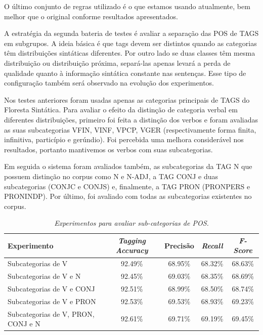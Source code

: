 O último conjunto de regras utilizado é o que estamos usando atualmente, bem melhor que o original conforme resultados apresentados. 

A estratégia da segunda bateria de testes é avaliar a separação das POS de TAGS em subgrupos. A ideia básica é que tags devem ser distintos quando as categorias têm distribuições sintáticas diferentes. Por outro lado se duas classes têm mesma distribuição ou distribuição próxima, separá-las apenas levará a perda de qualidade quanto à informação sintática constante nas sentenças. Esse tipo de configuração também será observado na evolução dos experimentos.

Nos testes anteriores foram usadas apenas as categorias principais de TAGS do Floresta Sintática. Para avaliar o efeito da distinção de categoria verbal em diferentes distribuições, primeiro foi feita a distinção dos verbos e foram avaliadas as suas subcategorias VFIN, VINF, VPCP, VGER (respectivamente forma finita, infinitiva, particípio e gerúndio). Foi percebida uma melhora considerável nos resultados, portanto mantivemos os verbos com suas subcategorias. 

Em seguida o sistema foram avaliados também, as subcategorias da TAG N que possuem distinção no corpus como N e N-ADJ, a TAG CONJ e duas subcategorias (CONJC e CONJS) e, finalmente, a TAG PRON (PRONPERS e PRONINDP). Por último, foi avaliado com todas as subcategorias existentes no corpus.


\begin{table}[H]
\centering
\footnotesize
\caption{\it Experimentos para avaliar sub-categorias de POS.}
	\begin{tabular}{|l|c|c|c|c|}
		\hline
		\textbf{Experimento} &  \textbf{\emph{Tagging Accuracy}} & \textbf{Precisão} & \textbf{\emph{Recall}} & \textbf{\emph{F-Score}} \\
		\hline
		Subcategorias de V & 92.49\% & 68.95\% & 68.32\% & 68.63\%\\
		\hline		
		Subcategorias de V e N & 92.45\% & 69.03\% & 68.35\% & 68.69\%\\
		\hline		
		Subcategorias de V e CONJ & 92.51\% & 68.99\% & 68.50\% & 68.74\%\\
		\hline		
		Subcategorias de V e PRON & 92.53\% & 69.53\% & 68.93\% & 69.23\%\\
		\hline
		Subcategorias de V, PRON, CONJ e N & 92.61\% & 69.71\% & 69.19\% & 69.45\%\\
		\hline
	\end{tabular}
	\label{tab:segundo_experimento}
\end{table}


